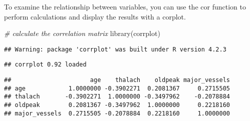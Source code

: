 \documentclass[
]{article}
\newenvironment{Shaded}{\begin{snugshade}}{\end{snugshade}}
\newcommand{\CommentTok}[1]{\textcolor[rgb]{0.56,0.35,0.01}{\textit{#1}}}
\newcommand{\FunctionTok}[1]{\textcolor[rgb]{0.00,0.00,0.00}{#1}}
\newcommand{\NormalTok}[1]{#1}
\newcommand{\OtherTok}[1]{\textcolor[rgb]{0.56,0.35,0.01}{#1}}
\newcommand{\SpecialCharTok}[1]{\textcolor[rgb]{0.00,0.00,0.00}{#1}}
\newcommand{\StringTok}[1]{\textcolor[rgb]{0.31,0.60,0.02}{#1}}
\begin{document}
To examine the relationship between variables, you can use the cor
function to perform calculations and display the results with a corplot.

\begin{Shaded}
\begin{Highlighting}[]
\CommentTok{\# calculate the correlation matrix}
\FunctionTok{library}\NormalTok{(corrplot)}
\end{Highlighting}
\end{Shaded}

\begin{verbatim}
## Warning: package 'corrplot' was built under R version 4.2.3
\end{verbatim}

\begin{verbatim}
## corrplot 0.92 loaded
\end{verbatim}

\begin{Shaded}
\end{Shaded}

\begin{verbatim}
##                      age    thalach    oldpeak major_vessels
## age            1.0000000 -0.3902271  0.2081367     0.2715505
## thalach       -0.3902271  1.0000000 -0.3497962    -0.2078884
## oldpeak        0.2081367 -0.3497962  1.0000000     0.2218160
## major_vessels  0.2715505 -0.2078884  0.2218160     1.0000000
\end{verbatim}
\end{document}
